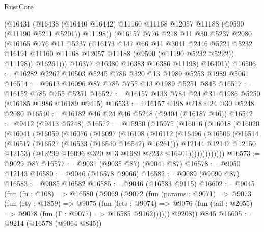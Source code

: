 \begin{lexlean}{RustCore}
\begin{coremodule}
              (@16431
                (@16438
                  (@16440 @16442)
                  @11160
                  @11168
                  @12057
                  @11188
                  (@9590 (@11190 @5211 @5201))
                  @11198))
              (@16157
                @776
                @218
                @11
                @30
                @5237
                @2080
                (@16165
                  @776
                  @11
                  @5237
                  (@16173
                    @147
                    @66
                    @11
                    @3041
                    @2446
                    @5221
                    @5232
                    @16191
                    @11160
                    @11168
                    @12057
                    @11188
                    (@9590 (@11190 @5232 @5222))
                    @11198))
                @16261)))
          @16377
          @16380
          @16383
          @16386
          @11198)
        @16401))
@16506 := @16282 @2262 @10503 @5245 @786 @320 @13 @1989 @5253 @1989 @5061
@16514 := @9613 @16096 @87 @785 @755 @13 @1989 @5251 @845
@16517 := @16152 @785 @755 @5251
@16527 := @16157 @133 @784 @24 @31 @1986 @5250 (@16185 @1986 @16189 @9415)
@16533 := @16157 @198 @218 @24 @30 @5248 @2080
@16540 := @16182 @46 @24 @46 @5248 (@9404 (@16187 @46))
@16542 := @9412 (@9413 @5248)
@16572 := @15950
    (@15975
      (@16016
        (@16018
          (@16020
            (@16041
              (@16059
                (@16076
                  (@16097
                    (@16108
                      (@16112
                        (@16496
                          (@16506
                            (@16514
                              (@16517 (@16527 (@16533 (@16540 @16542) @16261)))
                              @12144
                              @12147
                              @12150
                              @12153)
                            (@12299 @16096 @320 @13 @1989 @2232 @16401)))))))))))))
@16573 := @9029 @87
@16577 := @9031 (@9035 @87) (@9041 @87)
@16578 := @9050 @12143
@16580 := @9046 (@16578 @9066)
@16582 := @9089 (@9090 @87)
@16583 := @9085 @16582
@16585 := @9046 (@16583 @9115)
@16602 := @9045
    (fun (fn : @108) =>
    @16580
      (@9069
        (@9072
          (fun (params : @9071) =>
          @9073
            (fun (rty : @1859) =>
            @9075
              (fun (lets : @9074) =>
              @9076 (fun (tail : @2055) => @9078 (fun (Γ : @9077) => @16585 @9162))))))
        @9208))
    @845
@16605 := @9214 (@16578 (@9064 @845))

\end{coremodule}
\end{lexlean}
